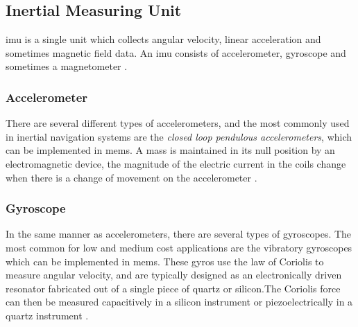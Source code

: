 \subsection{Inertial Measuring Unit}
\acrfull{imu} is a single unit which collects angular velocity, linear acceleration and sometimes magnetic field data. An \acrshort{imu} consists of accelerometer, gyroscope and sometimes a magnetometer \cite{vik}. 

\subsubsection{Accelerometer}
There are several different types of accelerometers, and the most commonly used in inertial navigation systems are the \textit{closed loop pendulous accelerometers}, which can be implemented in \acrfull{mems}. A mass is maintained in its null position by an electromagnetic device, the magnitude of the electric current in the coils change when there is a change of movement on the accelerometer \cite{vik}.

\subsubsection{Gyroscope}
In the same manner as accelerometers, there are several types of gyroscopes. The most common for low and medium cost applications are the vibratory gyroscopes which can be implemented in \acrshort{mems}. These gyros use the law of Coriolis to measure angular velocity, and are typically designed as an electronically driven resonator fabricated out of a single piece of quartz or silicon.The Coriolis force can then be measured capacitively in a silicon instrument or piezoelectrically in a quartz instrument \cite{vik}.
\newpage